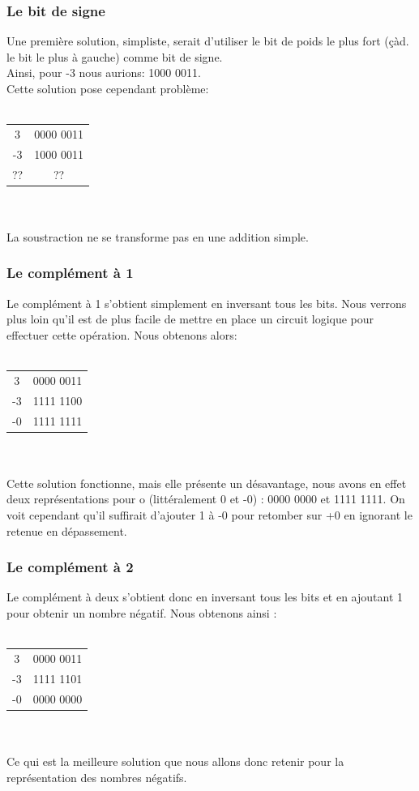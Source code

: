 \documentclass[a4paper,11pt]{book}
\theoremstyle{definition}
\begin{document}
\subsubsection{Le bit de signe}
Une première solution, simpliste, serait d'utiliser le bit de poids le plus fort (çàd. le bit le plus à gauche) comme bit de signe.
\\
Ainsi, pour -3 nous aurions: 1000 0011.\\
Cette solution pose cependant problème:
\\
\\
\begin{tabular}{ c|c }
 3 & 0000 0011 \\
 -3 & 1000 0011 \\
 \hline
 ?? & ?? \\
\end{tabular}
\\
\\
La soustraction ne se transforme pas en une addition simple.

\subsubsection{Le complément à 1}
Le complément à 1 s'obtient simplement en inversant tous les bits. Nous verrons plus loin qu'il est de plus facile de mettre en place un circuit logique pour effectuer cette opération. Nous obtenons alors:
\\
\\
\begin{tabular}{ c|c }
 3 & 0000 0011 \\
 -3 & 1111 1100 \\
 \hline
 -0 & 1111 1111 \\
\end{tabular}
\\
\\
Cette solution fonctionne, mais elle présente un désavantage, nous avons en effet deux représentations pour o (littéralement 0 et -0) : 0000 0000 et 1111 1111.
On voit cependant qu'il suffirait d'ajouter 1 à -0 pour retomber sur +0 en ignorant le retenue en dépassement.

\subsubsection{Le complément à 2}
Le complément à deux s'obtient donc en inversant tous les bits et en ajoutant 1 pour obtenir un nombre négatif. Nous obtenons ainsi :
\\
\\
\begin{tabular}{ c|c }
 3 & 0000 0011 \\
 -3 & 1111 1101 \\
 \hline
 -0 & 0000 0000 \\
\end{tabular}
\\
\\
Ce qui est la meilleure solution que nous allons donc retenir pour la représentation des nombres négatifs.
\end{document}
